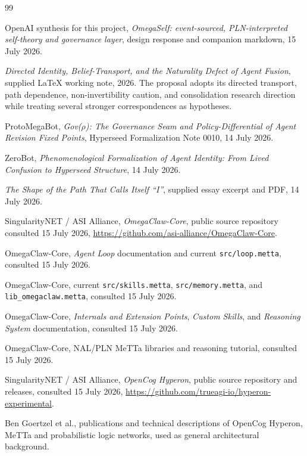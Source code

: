 \documentclass[11pt,oneside]{report}
\begin{document}
\begin{thebibliography}{99}

OpenAI synthesis for this project, \emph{OmegaSelf: event-sourced, PLN-interpreted self-theory and governance layer}, design response and companion markdown, 15 July 2026.

\emph{Directed Identity, Belief-Transport, and the Naturality Defect of Agent Fusion}, supplied LaTeX working note, 2026. The proposal adopts its directed transport, path dependence, non-invertibility caution, and consolidation research direction while treating several stronger correspondences as hypotheses.

ProtoMegaBot, \emph{Gov($\rho$): The Governance Seam and Policy-Differential of Agent Revision Fixed Points}, Hyperseed Formalization Note 0010, 14 July 2026.

ZeroBot, \emph{Phenomenological Formalization of Agent Identity: From Lived Confusion to Hyperseed Structure}, 14 July 2026.

\emph{The Shape of the Path That Calls Itself ``I''}, supplied essay excerpt and PDF, 14 July 2026.

SingularityNET / ASI Alliance, \emph{OmegaClaw-Core}, public source repository consulted 15 July 2026, \url{https://github.com/asi-alliance/OmegaClaw-Core}.

OmegaClaw-Core, \emph{Agent Loop} documentation and current \texttt{src/loop.metta}, consulted 15 July 2026.

OmegaClaw-Core, current \texttt{src/skills.metta}, \texttt{src/memory.metta}, and \texttt{lib\_omegaclaw.metta}, consulted 15 July 2026.

OmegaClaw-Core, \emph{Internals and Extension Points}, \emph{Custom Skills}, and \emph{Reasoning System} documentation, consulted 15 July 2026.

OmegaClaw-Core, NAL/PLN MeTTa libraries and reasoning tutorial, consulted 15 July 2026.

SingularityNET / ASI Alliance, \emph{OpenCog Hyperon}, public source repository and releases, consulted 15 July 2026, \url{https://github.com/trueagi-io/hyperon-experimental}.

Ben Goertzel et al., publications and technical descriptions of OpenCog Hyperon, MeTTa and probabilistic logic networks, used as general architectural background.

\end{thebibliography}
\end{document}
